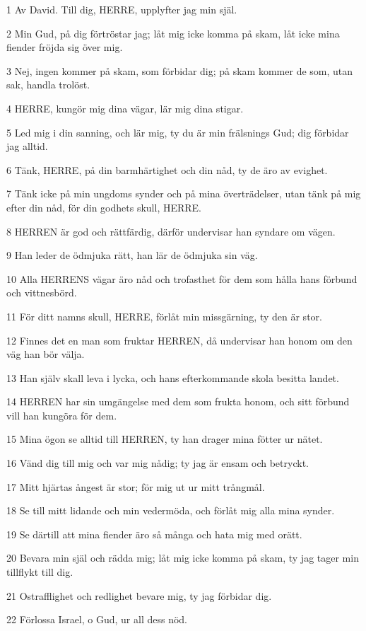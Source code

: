 \par 1 Av David. Till dig, HERRE, upplyfter jag min själ.
\par 2 Min Gud, på dig förtröstar jag; låt mig icke komma på skam, låt icke mina fiender fröjda sig över mig.
\par 3 Nej, ingen kommer på skam, som förbidar dig; på skam kommer de som, utan sak, handla trolöst.
\par 4 HERRE, kungör mig dina vägar, lär mig dina stigar.
\par 5 Led mig i din sanning, och lär mig, ty du är min frälsnings Gud; dig förbidar jag alltid.
\par 6 Tänk, HERRE, på din barmhärtighet och din nåd, ty de äro av evighet.
\par 7 Tänk icke på min ungdoms synder och på mina överträdelser, utan tänk på mig efter din nåd, för din godhets skull, HERRE.
\par 8 HERREN är god och rättfärdig, därför undervisar han syndare om vägen.
\par 9 Han leder de ödmjuka rätt, han lär de ödmjuka sin väg.
\par 10 Alla HERRENS vägar äro nåd och trofasthet för dem som hålla hans förbund och vittnesbörd.
\par 11 För ditt namns skull, HERRE, förlåt min missgärning, ty den är stor.
\par 12 Finnes det en man som fruktar HERREN, då undervisar han honom om den väg han bör välja.
\par 13 Han själv skall leva i lycka, och hans efterkommande skola besitta landet.
\par 14 HERREN har sin umgängelse med dem som frukta honom, och sitt förbund vill han kungöra för dem.
\par 15 Mina ögon se alltid till HERREN, ty han drager mina fötter ur nätet.
\par 16 Vänd dig till mig och var mig nådig; ty jag är ensam och betryckt.
\par 17 Mitt hjärtas ångest är stor; för mig ut ur mitt trångmål.
\par 18 Se till mitt lidande och min vedermöda, och förlåt mig alla mina synder.
\par 19 Se därtill att mina fiender äro så många och hata mig med orätt.
\par 20 Bevara min själ och rädda mig; låt mig icke komma på skam, ty jag tager min tillflykt till dig.
\par 21 Ostrafflighet och redlighet bevare mig, ty jag förbidar dig.
\par 22 Förlossa Israel, o Gud, ur all dess nöd.

